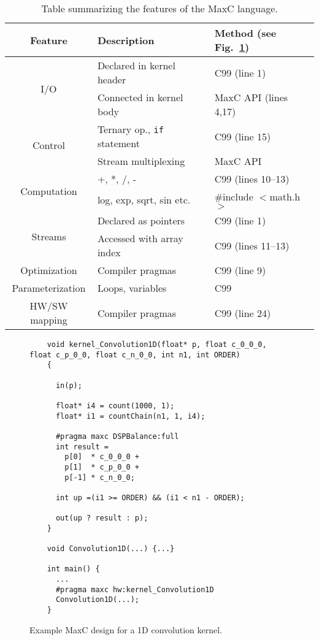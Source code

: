 \begin{table}[!h]
  \centering
\renewcommand{\arraystretch}{1.2}
\caption{Table summarizing the features of the MaxC language.}
\label{table:maxc-features}
\begin{tabular}{c|l|l}
\hline
\bf{Feature}         & \bf{Description}               & \bf{Method (see Fig.~\ref{fig:maxc-1dconv})} \\ 
\hline\hline
  \multirow{2}{*}{I/O} & Declared in kernel header & C99 (line 1) \\\cline{2-3}
                       & Connected in kernel body  & MaxC API (lines 4,17) \\ 
\hline
  \multirow{2}{*}{Control}  &  Ternary op., \texttt{if} statement & C99 (line 15) \\\cline{2-3}
                            & Stream multiplexing       & MaxC API  \\ 
\hline
  \multirow{2}{*}{Computation}  & +, *, /, -  & C99 (lines 10--13) \\\cline{2-3}
                               & log, exp, sqrt, sin etc.  & \#include $<$math.h$>$  \\ 
\hline
  \multirow{2}{*}{Streams}              &  Declared as pointers      & C99 (line 1) \\\cline{2-3}
                       & Accessed with array index & C99 (lines 11--13) \\
\hline
  Optimization         & Compiler pragmas          & C99 (line 9) \\ 
\hline
  Parameterization      & Loops, variables          & C99  \\   
\hline
HW/SW mapping          & Compiler pragmas          & C99 (line 24)   \\
\end{tabular}
\end{table}

\lstset{style=MaxC}

\begin{figure}[!h]
  \begin{lstlisting}
    void kernel_Convolution1D(float* p, float c_0_0_0, float c_p_0_0, float c_n_0_0, int n1, int ORDER)
    {

      in(p);

      float* i4 = count(1000, 1);
      float* i1 = countChain(n1, 1, i4);

      #pragma maxc DSPBalance:full
      int result =
        p[0]  * c_0_0_0 +
        p[1]  * c_p_0_0 +
        p[-1] * c_n_0_0;

      int up =(i1 >= ORDER) && (i1 < n1 - ORDER);

      out(up ? result : p);
    }

    void Convolution1D(...) {...}

    int main() {
      ...
      #pragma maxc hw:kernel_Convolution1D
      Convolution1D(...);
    }
  \end{lstlisting}
  \caption{Example MaxC design for a 1D convolution kernel.}
  \label{fig:maxc-1dconv}
\end{figure}

